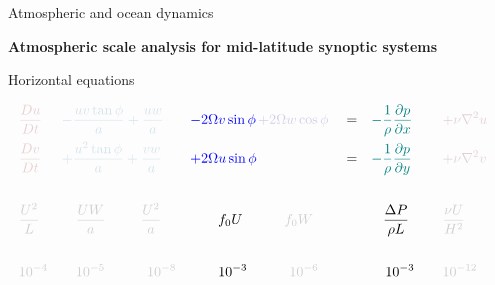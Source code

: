 \documentclass[aspectratio=169,xcolor=dvipsnames]{beamer}
\newcommand{\graylevel}{90} %
\newcommand{\textcolorg}[2]{%
  \textcolor{verylightgray!\graylevel!#1}{#2}%
}
\begin{document}
\begin{frame}[t]{Atmospheric and ocean dynamics}

\vspace{-1.0em}

\begin{center}
\textbf{{\large
Atmospheric scale analysis for mid-latitude synoptic systems
}}
\end{center}

\small 
\center 

\vspace{-0.5em}

Horizontal equations

\begin{align*}
    &\textcolorg{red}{    \frac{Du}{Dt}   }&
    &\textcolorg{cyan}{   - \frac{uv \tan\phi}{a} + \frac{uw}{a}  }& 
    & \textcolor{blue}{   - 2\Omega v \sin\phi }
     \textcolorg{blue}{  \,+ 2\Omega w \cos\phi }&
    & = &
    &\textcolor{teal}{   -\frac{1}{\rho}\frac{\partial p}{\partial x}  }&
    & \textcolorg{purple}{\quad + \nu \nabla^2 u }&
    \\
    &\textcolorg{red}{    \frac{Dv}{Dt}   } &
    &\textcolorg{cyan}{   + \frac{u^2 \tan\phi}{a} + \frac{vw}{a}     }&
    & \textcolor{blue}{   + 2\Omega u \sin\phi    }&
    & = &
    &\textcolor{teal}{   -\frac{1}{\rho}\frac{\partial p}{\partial y}  }&
    & \textcolorg{purple}{\quad + \nu \nabla^2 v }&
    \\ \\
      &\textcolorg{black}{ \frac{U^2}{L}  }&
      &\textcolorg{black}{ \quad \frac{UW}{a} \,\,\,\quad\quad\frac{U^2}{a} }&
      &\textcolor{black}{ \quad\quad f_0 U      }
       \textcolorg{black}{\quad\quad\quad f_0 W  }&
      &&
      &\textcolor{black}{ \,\,\,\,\,\frac{\Delta P}{\rho L}  }&
      &\textcolorg{black}{ \quad\frac{\nu U}{H^2} }&
    \\ \\
      &\textcolorg{black}{ 10^{-4} }&
      &\textcolorg{black}{ \quad10^{-5} \quad\quad\quad 10^{-8}  }&
      &\textcolor{black}{ \quad\quad10^{-3}        }
       \textcolorg{black}{ \quad\quad\quad 10^{-6} }&
      &&
      &\textcolor{black}{ \quad10^{-3}  }&
      &\textcolorg{black}{ \quad10^{-12} }&
\end{align*}

\end{frame}
\end{document}
